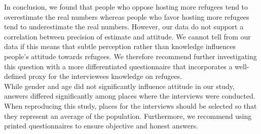 In conclusion, we found that people who oppose hosting more refugees tend to overestimate the real numbers whereas people who favor hosting more refugees tend to underestimate the real numbers. However, our data do not support a correlation between precision of estimate and attitude. We cannot tell from our data if this means that subtle perception rather than knowledge influences people's attitude towards refugees. We therefore recommend further investigating this question with a more differentiated questionnaire that incorporates a well-defined proxy for the interviewees knowledge on refugees.\\
While gender and age did not significantly influence attitude in our study, answers differed significantly among places where the interviews were conducted. When reproducing this study, places for the interviews should be selected so that they represent an average of the population. Furthermore, we recommend using printed questionnaires to ensure objective and honest answers.
